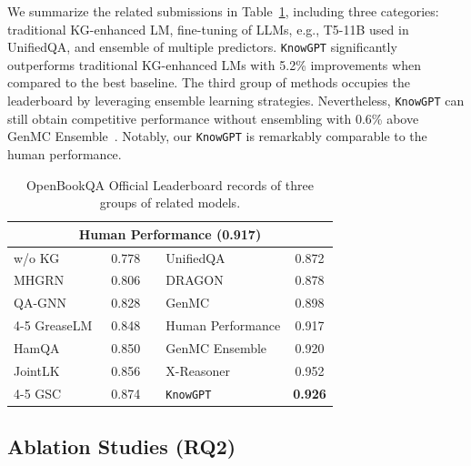 \documentclass{article}
\theoremstyle{boldremark}
\begin{document}
We summarize the related submissions in Table~\ref{tab:csqa_leaderboard}, including three categories: traditional KG-enhanced LM, fine-tuning of LLMs, e.g., T5-11B used in UnifiedQA, and ensemble of multiple predictors. \texttt{KnowGPT} significantly outperforms traditional KG-enhanced LMs with 5.2\% improvements when compared to the best baseline. 
The third group of methods occupies the leaderboard by leveraging ensemble learning strategies. Nevertheless, \texttt{KnowGPT} can still obtain competitive performance without ensembling with  0.6\% above GenMC Ensemble~\cite{huang2022clues}. Notably, our \texttt{KnowGPT} is remarkably comparable to the human performance. 

\begin{table}[!ht]

    \caption{OpenBookQA Official Leaderboard records of three groups of related models. 
    }
    \centering
    \setlength{\tabcolsep}{6.mm}
    \begin{tabular}{lcclc}
    \toprule
    \multicolumn{5}{c}{\textbf{Human Performance}  (\textbf{0.917})}\\
    \midrule
    w/o KG & 0.778 &&UnifiedQA~\cite{unifiedqa} & 0.872\\
    MHGRN~\cite{MHGRN} & 0.806 &&DRAGON~\cite{yasunaga2022deep}& 0.878\\  
    QA-GNN~\cite{QA-GNN} & 0.828 && GenMC~\cite{huang2022clues} & 0.898 \\ \cmidrule(lr){4-5}
    GreaseLM~\cite{zhang2022greaselm} & 0.848& &Human Performance  &  0.917
   \\
    HamQA~\cite{dong2023hierarchy}  & 0.850 &&GenMC Ensemble~\cite{huang2022clues}& 0.920\\
    JointLK~\cite{sun2021jointlk} & 0.856 && X-Reasoner~\cite{huang2023mvp}& 0.952 \\\cmidrule(lr){4-5}
    GSC~\cite{wang2021gnn} & 0.874 && \texttt{KnowGPT} & \textbf{0.926}\\
    \bottomrule
    \end{tabular}
    \label{tab:csqa_leaderboard}
    \vspace{-3mm}
\end{table}




\subsection{Ablation Studies (RQ2)}
\end{document}
